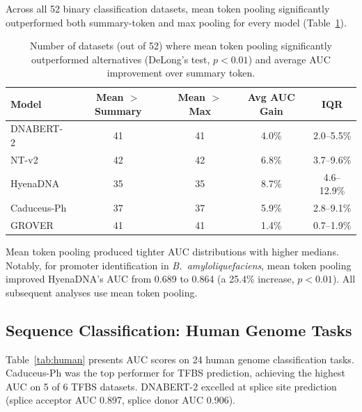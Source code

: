 \documentclass[11pt]{article}
\begin{document}
Across all 52 binary classification datasets, mean token pooling significantly outperformed both summary-token and max pooling for every model (Table~\ref{tab:pooling}).

\begin{table}[ht]
\centering
\caption{Number of datasets (out of 52) where mean token pooling significantly outperformed alternatives (DeLong's test, $p < 0.01$) and average AUC improvement over summary token.}
\label{tab:pooling}
\begin{tabular}{@{}lcccc@{}}
\toprule
Model & Mean $>$ Summary & Mean $>$ Max & Avg AUC Gain & IQR \\
\midrule
DNABERT-2 & 41 & 41 & 4.0\% & 2.0--5.5\% \\
NT-v2 & 42 & 42 & 6.8\% & 3.7--9.6\% \\
HyenaDNA & 35 & 35 & 8.7\% & 4.6--12.9\% \\
Caduceus-Ph & 37 & 37 & 5.9\% & 2.8--9.1\% \\
GROVER & 41 & 41 & 1.4\% & 0.7--1.9\% \\
\bottomrule
\end{tabular}
\end{table}

Mean token pooling produced tighter AUC distributions with higher medians.  Notably, for promoter identification in \emph{B.\ amyloliquefaciens}, mean token pooling improved HyenaDNA's AUC from 0.689 to 0.864 (a 25.4\% increase, $p < 0.01$).  All subsequent analyses use mean token pooling.

\subsection{Sequence Classification: Human Genome Tasks}

Table~\ref{tab:human} presents AUC scores on 24 human genome classification tasks.  Caduceus-Ph was the top performer for TFBS prediction, achieving the highest AUC on 5 of 6 TFBS datasets.  DNABERT-2 excelled at splice site prediction (splice acceptor AUC 0.897, splice donor AUC 0.906).
\end{document}
